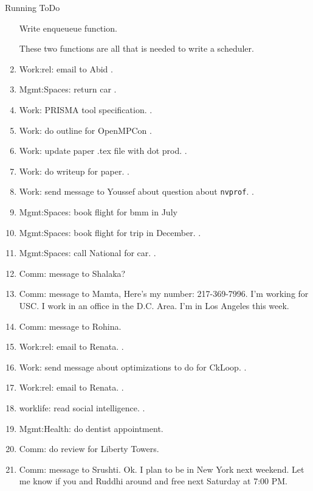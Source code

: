\begin{columns}
\begin{column}{0.6\linewidth}
\begin{block}{Running ToDo}
\begin{enumerate}
Write enqueueue function. 

These two functions are all that is needed to write a scheduler. 
 \item \tiny Work:rel: email to Abid . 
 \item \tiny Mgmt:Spaces: return car . 

\item \tiny Work: PRISMA tool specification. . 
 \item \tiny Work: do outline for OpenMPCon . 
 \item \tiny Work: update paper .tex file with dot prod.  . 
 \item \tiny Work: do writeup for paper. . 
 \item \tiny Work: send message to Youssef about question about
   \texttt{nvprof}. . 

 \item \tiny Mgmt:Spaces: book flight for bmm in July 
 \item \tiny Mgmt:Spaces: book flight for trip in December. .
 \item \tiny Mgmt:Spaces: call National for car. . 
 \item \tiny Comm: message to Shalaka? 

 \item \tiny Comm: message to Mamta, 
   Here's my number: 217-369-7996. I'm working for USC. I work in an
   office in the D.C. Area. I'm in Los Angeles this week. 
 \item \tiny Comm: message to Rohina.

 \item \tiny Work:rel: email to Renata. . 
 \item \tiny Work: send message about optimizations to do for
   CkLoop.  . 

 \item \tiny Work:rel: email to Renata. .
 \item \tiny worklife: read social intelligence. . 

 \item \tiny Mgmt:Health: do dentist appointment. 

 \item \tiny Comm: do review for Liberty Towers.

 \item \tiny Comm: message to Srushti. Ok. I plan to be in New York next weekend. Let me know if you and Ruddhi around and free next Saturday at 7:00 PM. 
   

\end{enumerate}
\end{block}
\end{column}
\end{columns}
